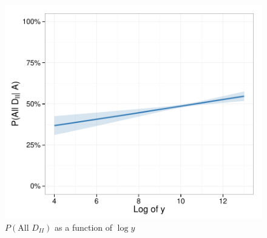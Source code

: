 \documentclass[1p, review]{elsarticle}\usepackage[]{graphicx}\usepackage[]{color}
\makeatletter
\def\maxwidth{ %
  \ifdim\Gin@nat@width>\linewidth
    \linewidth
  \else
    \Gin@nat@width
  \fi
}
\newenvironment{knitrout}{}{} %
\makeatother
\begin{document}
\begin{knitrout}\small
{}\color{fgcolor}\begin{figure}[]


{\centering \includegraphics[width=\maxwidth]{figure/ModelResultGph1} 

}

\caption[$P(\text{All } D_{II})$ as a function of $\log{y}$]{$P(\text{All } D_{II})$ as a function of $\log{y}$\label{modModelResultGph1}}
\end{figure}


\end{knitrout}
\end{document}
